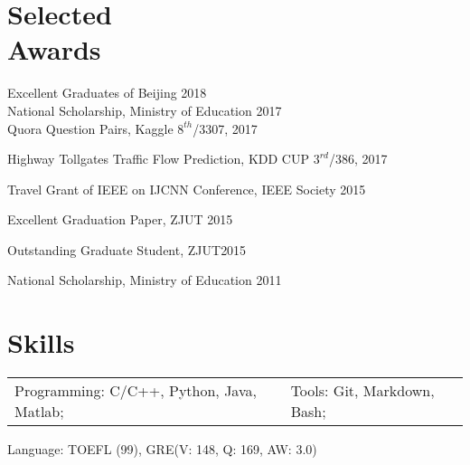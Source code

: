 \documentclass[margin,line]{resume}
\begin{document}
\begin{resume}
\section{Selected \\ Awards}
Excellent Graduates of Beijing \hfill {2018} \\
National Scholarship, Ministry of Education \hfill {2017}\\
Quora Question Pairs, Kaggle \hfill {$8^{th}$/3307, 2017}

Highway Tollgates Traffic Flow Prediction, KDD CUP  \hfill {$3^{rd}$/386, 2017}

Travel Grant of IEEE on IJCNN Conference, IEEE Society \hfill { 2015}

Excellent Graduation Paper, ZJUT \hfill {2015}

Outstanding Graduate Student, ZJUT\hfill {2015}


National Scholarship, Ministry of Education \hfill {2011}



%
%
%

\section{ Skills}
\begin{tabular}{@{}p{3.2in}p{4in}}
Programming: C/C++, Python, Java, Matlab;& Tools: Git, Markdown, Bash; \\
\end{tabular}
Language: TOEFL (99), GRE(V: 148, Q: 169, AW: 3.0)


\end{resume}
\end{document}
